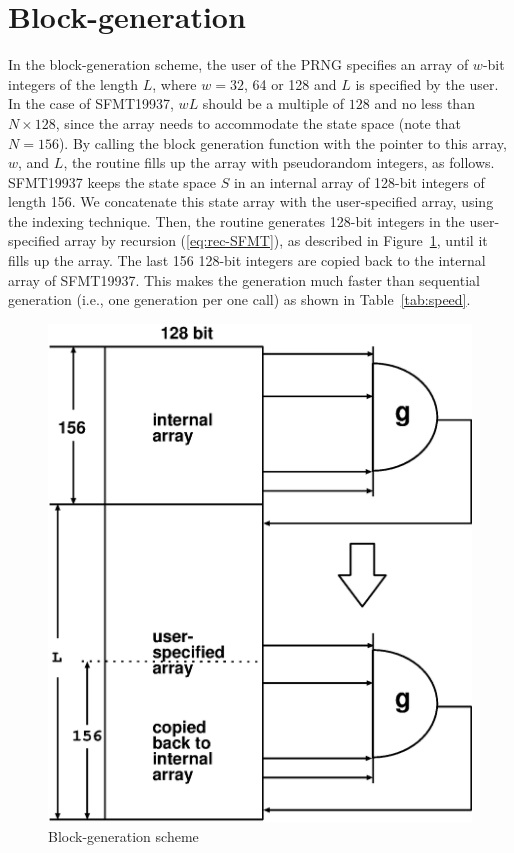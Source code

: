 \documentclass{svmult}
\begin{document}
\section{Block-generation}\label{sec:block}
In the block-generation scheme, 
the user of the PRNG specifies an array
of $w$-bit integers of the length $L$, 
where $w=32$, 64 or 128 and $L$ is specified
by the user.
In the case of SFMT19937,
$wL$ should be a multiple of $128$
and no less than $N \times 128$,
since the array needs to accommodate the state space
(note that $N=156$).
By calling the block generation function 
with the pointer to this array, $w$, and $L$, 
the routine fills up the array with
pseudorandom integers, as follows. SFMT19937 keeps the state
space $S$ in an internal array of 128-bit integers of length 156.
We concatenate this state array with the user-specified array, 
using the indexing technique.
Then, the routine generates 128-bit integers in the user-specified 
array by recursion (\ref{eq:rec-SFMT}), as described
in Figure~\ref{fig:B1}, until it fills up the array.
The last 156 128-bit integers
are copied back to the internal array
of SFMT19937. 
This makes the generation much faster than sequential generation
(i.e., one generation per one call) as shown in Table~\ref{tab:speed}.
\begin{figure}
\begin{center}
\includegraphics[width=0.7\linewidth,height=0.4\textheight,
keepaspectratio]{fill_array.eps}
\end{center}
\caption{Block-generation scheme}
\label{fig:B1}
\end{figure}
\end{document}
